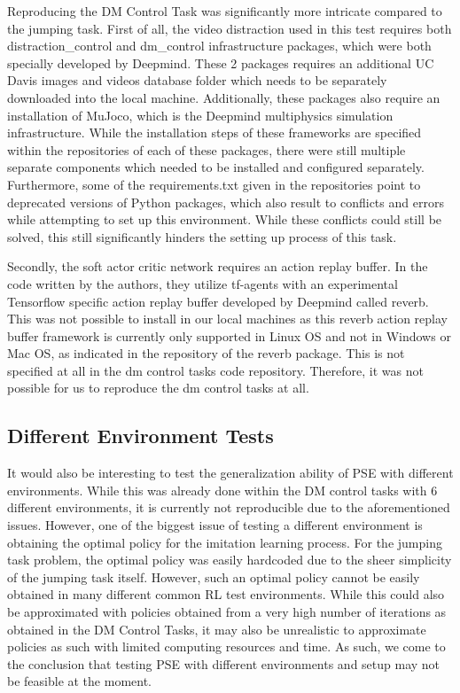 \documentclass{usiinftr}
\begin{document}
Reproducing the DM Control Task was significantly more intricate compared to the jumping task. First of all, the video distraction used in this test requires both distraction\_control and dm\_control infrastructure packages, which were both specially developed by Deepmind. These 2 packages requires an additional UC Davis images and videos database folder which needs to be separately downloaded into the local machine. Additionally, these packages also require an installation of MuJoco, which is the Deepmind multiphysics simulation infrastructure. While the installation steps of these frameworks are specified within the repositories of each of these packages, there were still multiple separate components which needed to be installed and configured separately. Furthermore, some of the requirements.txt given in the repositories point to deprecated versions of Python packages, which also result to conflicts and errors while attempting to set up this environment. While these conflicts could still be solved, this still significantly hinders the setting up process of this task. 

Secondly, the soft actor critic network requires an action replay buffer. In the code written by the authors, they utilize tf-agents with an experimental Tensorflow specific action replay buffer developed by Deepmind called reverb. This was not possible to install in our local machines as this reverb action replay buffer framework is currently only supported in Linux OS and not in Windows or Mac OS, as indicated in the repository of the reverb package. This is not specified at all in the dm control tasks code repository. Therefore, it was not possible for us to reproduce the dm control tasks at all.  
\subsection{Different Environment Tests}
It would also be interesting to test the generalization ability of PSE with different environments. While this was already done within the DM control tasks with 6 different environments, it is currently not reproducible due to the aforementioned issues. However, one of the biggest issue of testing a different environment is obtaining the optimal policy for the imitation learning process. For the jumping task problem, the optimal policy was easily hardcoded due to the sheer simplicity of the jumping task itself. However, such an optimal policy cannot be easily obtained in many different common RL test environments. While this could also be approximated with policies obtained from a very high number of iterations as obtained in the DM Control Tasks, it may also be unrealistic to approximate policies as such with limited computing resources and time. As such, we come to the conclusion that testing PSE with different environments and setup may not be feasible at the moment. 
\end{document}
